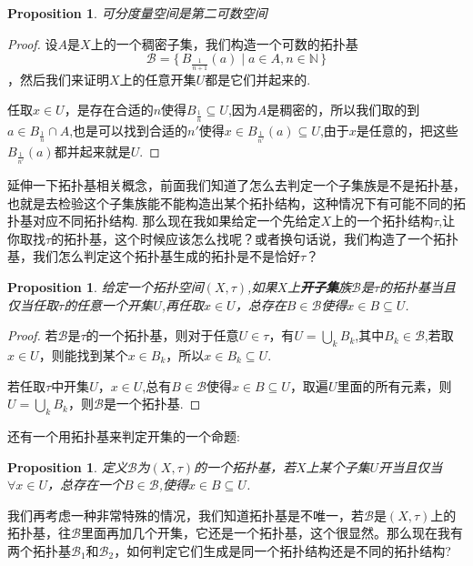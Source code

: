 \documentclass{article}
\newtheorem{proposition}[theorem]{Proposition}
\newcommand\Set[2]{\{\,#1\mid#2\,\}} %
\begin{document}
\begin{proposition}
可分度量空间是第二可数空间
\end{proposition}

\begin{proof}
设$A$是$X$上的一个稠密子集，我们构造一个可数的拓扑基\[\mathscr{B}=\Set{B_{\frac{1}{n+1}}(a)}{a \in A,n \in \mathbb{N}}\]，然后我们来证明$X$上的任意开集$U$都是它们并起来的.

任取$x \in U$，是存在合适的$n$使得$B_{\frac{1}{n}} \subseteq U$,因为$A$是稠密的，所以我们取的到$a \in B_{\frac{1}{n}} \cap A$,也是可以找到合适的$n'$使得$x \in B_{\frac{1}{n'}}(a) \subseteq U$,由于$x$是任意的，把这些$B_{\frac{1}{n'}}(a)$都并起来就是$U$.
\end{proof}

延伸一下拓扑基相关概念，前面我们知道了怎么去判定一个子集族是不是拓扑基，也就是去检验这个子集族能不能构造出某个拓扑结构，这种情况下有可能不同的拓扑基对应不同拓扑结构. 那么现在我如果给定一个先给定$X$上的一个拓扑结构$\tau$,让你取找$\tau$的拓扑基，这个时候应该怎么找呢？或者换句话说，我们构造了一个拓扑基，我们怎么判定这个拓扑基生成的拓扑是不是恰好$\tau$？

\begin{proposition}
给定一个拓扑空间$(X,\tau)$,如果$X$上\textbf{开子集}族$\mathscr{B}$是$\tau$的拓扑基当且仅当任取$\tau$的任意一个开集$U$,再任取$x \in U$，总存在$B \in \mathscr{B}$使得$x \in B \subseteq U$.
\end{proposition}

\begin{proof}
若$\mathscr{B}$是$\tau$的一个拓扑基，则对于任意$U \in \tau$，有$U = \bigcup\limits_k B_k$,其中$B_k \in \mathscr{B}$,若取$x \in U$，则能找到某个$x \in B_k$，所以$x \in B_k \subseteq U$.

若任取$\tau$中开集$U$，$x \in U$,总有$B \in \mathscr{B}$使得$x \in B \subseteq U$，取遍$U$里面的所有元素，则$U = \bigcup\limits_k B_k$，则$\mathscr{B}$是一个拓扑基.
\end{proof}

还有一个用拓扑基来判定开集的一个命题:

\begin{proposition}
定义$\mathscr{B}$为$(X,\tau)$的一个拓扑基，若$X$上某个子集$U$开当且仅当$\forall x \in U$，总存在一个$B \in \mathscr{B}$,使得$x \in B \subseteq U$.
\end{proposition}

我们再考虑一种非常特殊的情况，我们知道拓扑基是不唯一，若$\mathscr{B}$是$(X,\tau)$上的拓扑基，往$\mathscr{B}$里面再加几个开集，它还是一个拓扑基，这个很显然。那么现在我有两个拓扑基$\mathscr{B}_1$和$\mathscr{B}_2$，如何判定它们生成是同一个拓扑结构还是不同的拓扑结构?
\end{document}
